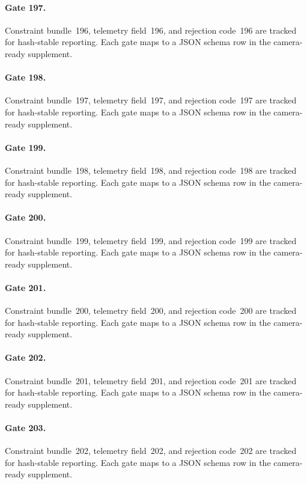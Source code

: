 \documentclass[sigconf,nonacm]{acmart}
\begin{document}
\paragraph{Gate 197.}
Constraint bundle~196, telemetry field~196, and rejection code~196 are tracked for hash-stable reporting. Each gate maps to a JSON schema row in the camera-ready supplement. %

\paragraph{Gate 198.}
Constraint bundle~197, telemetry field~197, and rejection code~197 are tracked for hash-stable reporting. Each gate maps to a JSON schema row in the camera-ready supplement. %

\paragraph{Gate 199.}
Constraint bundle~198, telemetry field~198, and rejection code~198 are tracked for hash-stable reporting. Each gate maps to a JSON schema row in the camera-ready supplement. %

\paragraph{Gate 200.}
Constraint bundle~199, telemetry field~199, and rejection code~199 are tracked for hash-stable reporting. Each gate maps to a JSON schema row in the camera-ready supplement. %

\paragraph{Gate 201.}
Constraint bundle~200, telemetry field~200, and rejection code~200 are tracked for hash-stable reporting. Each gate maps to a JSON schema row in the camera-ready supplement. %

\paragraph{Gate 202.}
Constraint bundle~201, telemetry field~201, and rejection code~201 are tracked for hash-stable reporting. Each gate maps to a JSON schema row in the camera-ready supplement. %

\paragraph{Gate 203.}
Constraint bundle~202, telemetry field~202, and rejection code~202 are tracked for hash-stable reporting. Each gate maps to a JSON schema row in the camera-ready supplement. %
\end{document}
